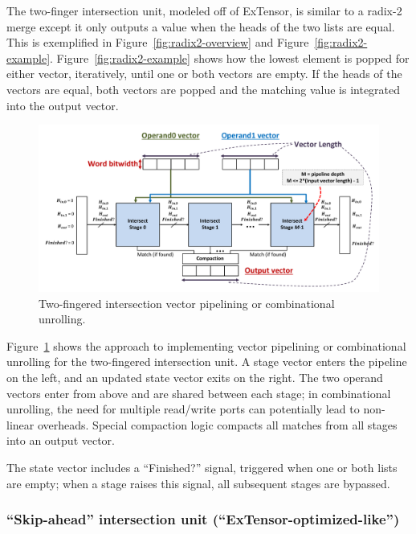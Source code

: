 The two-finger intersection unit, modeled off of ExTensor\cite{extensor}, is similar to a radix-2 merge except it only outputs a value when the heads of the two lists are equal. This is exemplified in Figure~\ref{fig:radix2-overview} and Figure~\ref{fig:radix2-example}. Figure~\ref{fig:radix2-example} shows how the lowest element is popped for either vector, iteratively, until one or both vectors are empty. If the heads of the vectors are equal, both vectors are popped and the matching value is integrated into the output vector.

\begin{figure}[H]
    \centering
    \includegraphics[width=\linewidth]{figures/two_finger_merge_pipeline.pdf}
    \caption{Two-fingered intersection vector pipelining or combinational unrolling.}
    \label{fig:radix_2_vector pipeline}
\end{figure}

Figure~\ref{fig:radix_2_vector pipeline} shows the approach to implementing vector pipelining or combinational unrolling for the two-fingered intersection unit. A stage vector enters the pipeline on the left, and an updated state vector exits on the right. The two operand vectors enter from above and are shared between each stage; in combinational unrolling, the need for multiple read/write ports can potentially lead to non-linear overheads. Special compaction logic compacts all matches from all stages into an output vector.

The state vector includes a ``Finished?'' signal, triggered when one or both lists are empty; when a stage raises this signal, all subsequent stages are bypassed.

\subsubsection{``Skip-ahead'' intersection unit (``ExTensor-optimized-like'')}

